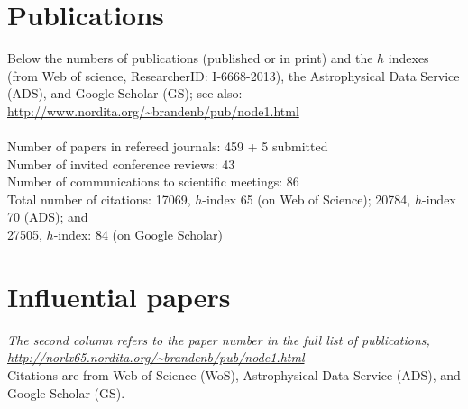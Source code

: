 \documentclass{article}
\begin{document}
\section*{Publications}
Below the numbers of publications (published or in print)
and the $h$ indexes (from Web of science, ResearcherID: I-6668-2013),
the Astrophysical Data Service (ADS), and Google Scholar (GS); see also:\\
\url{http://www.nordita.org/~brandenb/pub/node1.html}\\
\\
Number of papers in refereed journals: 459 + 5 submitted\\
Number of invited conference reviews: 43\\
Number of communications to scientific meetings: 86\\
Total number of citations:
17069, $h$-index 65 (on Web of Science); %
20784, $h$-index 70 (ADS); and \\ %
27505, $h$-index: 84 (on Google Scholar)\\ %

\section*{Influential papers}

{\it
The second column refers to the paper number in the full list of publications,\\
\url{http://norlx65.nordita.org/~brandenb/pub/node1.html}}\\
Citations are from Web of Science (WoS),
Astrophysical Data Service (ADS), and Google Scholar (GS).\\
\vspace{2mm}
\end{document}
